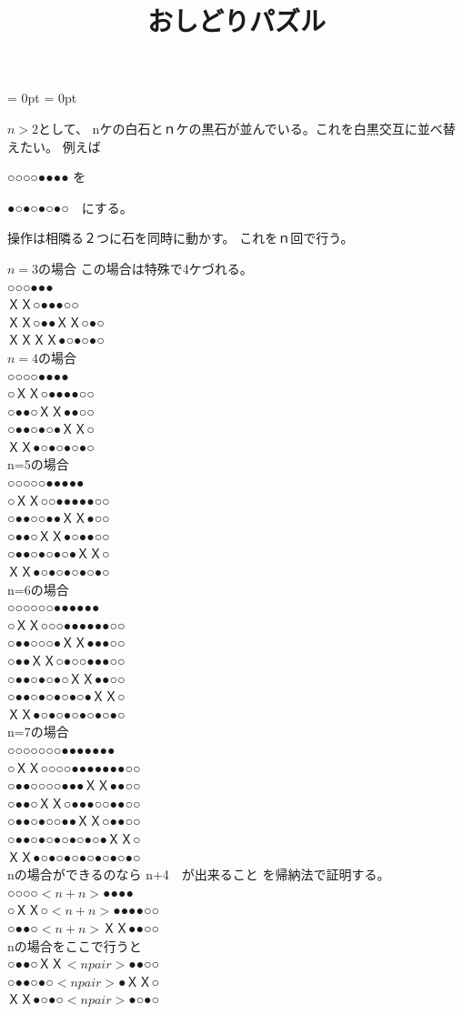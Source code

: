 \documentclass[fleqn]{article}
\begin{document}
\title{おしどりパズル}
\maketitle
\hoffset = 0pt
\voffset = 0pt
\topmargin=0pt
\textheight=21cm
\headheight=0pt
\headsep=0pt

$n>2$として、
nケの白石とｎケの黒石が並んでいる。これを白黒交互に並べ替えたい。
例えば

○○○○●●●● を

●○●○●○●○　にする。

操作は相隣る２つに石を同時に動かす。
これをｎ回で行う。

$n=3$の場合  この場合は特殊で4ケづれる。\\
○○○●●●\\
ＸＸ○●●●○○\\
ＸＸ○●●ＸＸ○●○\\
ＸＸＸＸ●○●○●○\\


$n=4$の場合\\
○○○○●●●●\\
○ＸＸ○●●●●○○\\
○●●○ＸＸ●●○○\\
○●●○●○●ＸＸ○\\
ＸＸ●○●○●○●○\\





n=5の場合\\
○○○○○●●●●●\\
○ＸＸ○○●●●●●○○\\
○●●○○●●ＸＸ●○○\\
○●●○ＸＸ●○●●○○\\
○●●○●○●○●ＸＸ○\\
ＸＸ●○●○●○●○●○\\


n=6の場合\\
○○○○○○●●●●●●\\
○ＸＸ○○○●●●●●●○○\\
○●●○○○●ＸＸ●●●○○\\
○●●ＸＸ○●○○●●●○○\\
○●●○●○●○ＸＸ●●○○\\
○●●○●○●○●○●ＸＸ○\\
ＸＸ●○●○●○●○●○●○\\

n=7の場合\\
○○○○○○○●●●●●●●\\
○ＸＸ○○○○●●●●●●●○○\\
○●●○○○○●●●ＸＸ●●○○\\
○●●○ＸＸ○●●●○○●●○○\\
○●●○●○○●●ＸＸ○●●○○\\
○●●○●○●○●○●○●ＸＸ○\\
ＸＸ●○●○●○●○●○●○●○\\

nの場合ができるのなら n+4　が出来ること
を帰納法で証明する。\\
○○○○$<n+n>$●●●●\\
○ＸＸ○$<n+n>$●●●●○○\\
○●●○$<n+n>$ＸＸ●●○○\\

nの場合をここで行うと\\
○●●○ＸＸ$<n pair>$●●○○\\
○●●○●○$<n pair>$●ＸＸ○\\
ＸＸ●○●○$<n pair>$●○●○\\
\end{document}
